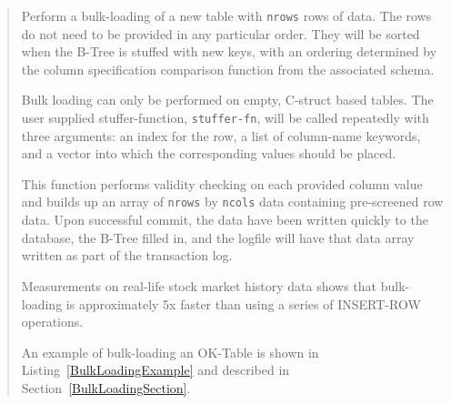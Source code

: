 \documentclass[article,oneside]{memoir}
\begin{document}
\begin{quote}
Perform a bulk-loading of a new table with \texttt{nrows} rows of data. The rows do not need to be provided in any particular order. They will be sorted when the B-Tree is stuffed with new keys, with an ordering determined by the column specification comparison function from the associated schema.

Bulk loading can only be performed on empty, C-struct based tables. The user supplied stuffer-function, \texttt{stuffer-fn}, will be called repeatedly with three arguments: an index for the row, a list of column-name keywords, and a vector into which the corresponding values should be placed.

This function performs validity checking on each provided column value and builds up an array of \texttt{nrows} by \texttt{ncols} data containing pre-screened row data. Upon successful commit, the data have been written quickly to the database, the B-Tree filled in, and the logfile will have that data array written as part of the transaction log.

Measurements on real-life stock market history data shows that bulk-loading is approximately 5x faster than using a series of INSERT-ROW operations.

An example of bulk-loading an OK-Table is shown in Listing~\ref{BulkLoadingExample} and described in Section~\ref{BulkLoadingSection}.

\end{quote}
\end{document}

